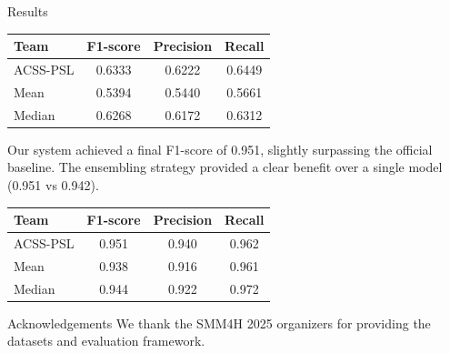\documentclass[final]{beamer}
\newlength{\sepwidth}
\newlength{\colwidth}
\newcommand{\separatorcolumn}{\begin{column}{\sepwidth}\end{column}}
\begin{document}
\begin{frame}[t]
\begin{columns}[t]
\begin{column}{\colwidth}
\begin{block}{Results}
\begin{center}
    \begin{tabular}{lccc}
    \toprule
    \textbf{Team} & \textbf{F1-score} & \textbf{Precision} & \textbf{Recall} \\
    \midrule
    ACSS-PSL & 0.6333 & 0.6222 & 0.6449 \\
    Mean     & 0.5394 & 0.5440 & 0.5661 \\
    Median   & 0.6268 & 0.6172 & 0.6312 \\
    \bottomrule
    \end{tabular}
    \end{center}
    
    Our system achieved a final F1-score of 0.951, slightly surpassing the official baseline. The ensembling strategy provided a clear benefit over a single model (0.951 vs 0.942).
    \begin{center}
    \begin{tabular}{lccc}
    \toprule
    \textbf{Team} & \textbf{F1-score} & \textbf{Precision} & \textbf{Recall} \\
    \midrule
    ACSS-PSL & 0.951 & 0.940 & 0.962 \\
    Mean     & 0.938 & 0.916 & 0.961 \\
    Median   & 0.944 & 0.922 & 0.972 \\
    \bottomrule
    \end{tabular}
    \end{center}
  \end{block}
  
  \vfill %

  \begin{block}{Acknowledgements}
    We thank the SMM4H 2025 organizers for providing the datasets and evaluation framework.
\end{block}

    
\end{column}

\separatorcolumn

\end{columns}
\end{frame}
\end{document}

